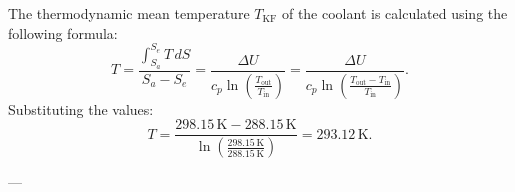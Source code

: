 The thermodynamic mean temperature \( T_{\text{KF}} \) of the coolant is calculated using the following formula:  
\[
T = \frac{\int_{S_a}^{S_e} T \, dS}{S_a - S_e} = \frac{\Delta U}{c_p \ln\left(\frac{T_{\text{out}}}{T_{\text{in}}}\right)} = \frac{\Delta U}{c_p \ln\left(\frac{T_{\text{out}} - T_{\text{in}}}{T_{\text{in}}}\right)}.
\]  
Substituting the values:  
\[
T = \frac{298.15 \, \text{K} - 288.15 \, \text{K}}{\ln\left(\frac{298.15 \, \text{K}}{288.15 \, \text{K}}\right)} = 293.12 \, \text{K}.
\]  

---
